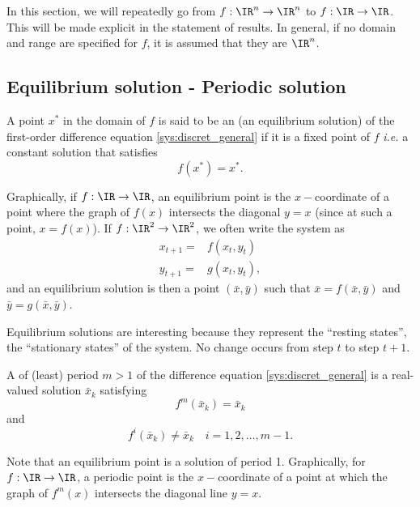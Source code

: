 In this section, we will repeatedly go from $f:\IR^n\to\IR^n$ to $f:\IR\to\IR$. This will be made explicit in the statement of results. In general, if no domain and range are specified for $f$, it is assumed that they are $\IR^n$.

\subsection{Equilibrium solution - Periodic solution}
\begin{definition}\label{def:fixedpoint}
A point $x^*$ in the domain of $f$ is said to be an  (an equilibrium solution) of the first-order difference equation \eqref{sys:discret_general} if it is a fixed point of $f$ \emph{i.e.} a constant solution that satisfies
$$f(x^*)=x^*.$$
\end{definition}
Graphically, if $f:\IR\to\IR$, an equilibrium point is the $x-$coordinate of a point where the graph of $f(x)$ intersects the diagonal $y=x$ (since at such a point, $x=f(x)$).
If $f:\IR^2\to\IR^2$, we often write the system as
$$
\begin{array}{cc}
x_{t+1}=&f(x_t,y_t)\\
y_{t+1}=&g(x_t,y_t),
\end{array}
$$
and an equilibrium solution is then a point $(\bar x, \bar y)$ such that $\bar x= f(\bar x,\bar y)$ and $\bar y=g(\bar x,\bar y)$.

\begin{remark}
Equilibrium solutions are interesting because they represent the ``resting states'', the ``stationary states'' of the system. No change occurs from step $t$ to step $t+1$. 
\end{remark}







\begin{definition}
A  of (least) period $m>1$ of the difference equation \eqref{sys:discret_general} is a real-valued solution $\bar x_k$ satisfying
$$f^m(\bar x_k)=\bar x_k$$ and $$f^i(\bar x_k)\not =\bar x_k \quad i=1,2,\dots, m-1.$$
\end{definition}

Note that an equilibrium point is a solution of period 1.
Graphically, for $f:\IR\to\IR$, a periodic point is the $x-$coordinate of a point at which the graph of $f^m(x)$ intersects the diagonal line $y=x$.



